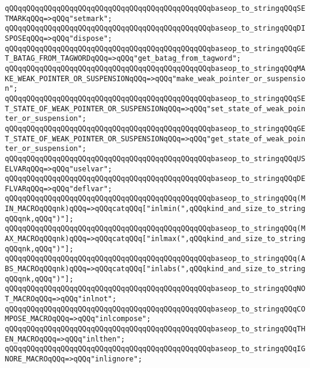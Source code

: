 \verb|qQQqqQQqqQQqqQQqqQQqqQQqqQQqqQQqqQQqqQQqqQQqqQQqbaseop_to_stringqQQqSETMARKqQQq=>qQQq"setmark";|\newline
\verb|qQQqqQQqqQQqqQQqqQQqqQQqqQQqqQQqqQQqqQQqqQQqqQQqbaseop_to_stringqQQqDISPOSEqQQq=>qQQq"dispose";|\newline
\verb|qQQqqQQqqQQqqQQqqQQqqQQqqQQqqQQqqQQqqQQqqQQqqQQqbaseop_to_stringqQQqGET_BATAG_FROM_TAGWORDqQQq=>qQQq"get_batag_from_tagword";|\newline
\verb|qQQqqQQqqQQqqQQqqQQqqQQqqQQqqQQqqQQqqQQqqQQqqQQqbaseop_to_stringqQQqMAKE_WEAK_POINTER_OR_SUSPENSIONqQQq=>qQQq"make_weak_pointer_or_suspension";|\newline
\verb|qQQqqQQqqQQqqQQqqQQqqQQqqQQqqQQqqQQqqQQqqQQqqQQqbaseop_to_stringqQQqSET_STATE_OF_WEAK_POINTER_OR_SUSPENSIONqQQq=>qQQq"set_state_of_weak_pointer_or_suspension";|\newline
\verb|qQQqqQQqqQQqqQQqqQQqqQQqqQQqqQQqqQQqqQQqqQQqqQQqbaseop_to_stringqQQqGET_STATE_OF_WEAK_POINTER_OR_SUSPENSIONqQQq=>qQQq"get_state_of_weak_pointer_or_suspension";|\newline
\verb|qQQqqQQqqQQqqQQqqQQqqQQqqQQqqQQqqQQqqQQqqQQqqQQqbaseop_to_stringqQQqUSELVARqQQq=>qQQq"uselvar";|\newline
\verb|qQQqqQQqqQQqqQQqqQQqqQQqqQQqqQQqqQQqqQQqqQQqqQQqbaseop_to_stringqQQqDEFLVARqQQq=>qQQq"deflvar";|\newline
\verb|qQQqqQQqqQQqqQQqqQQqqQQqqQQqqQQqqQQqqQQqqQQqqQQqbaseop_to_stringqQQq(MIN_MACROqQQqnk)qQQq=>qQQqcatqQQq["inlmin(",qQQqkind_and_size_to_stringqQQqnk,qQQq")"];|\newline
\verb|qQQqqQQqqQQqqQQqqQQqqQQqqQQqqQQqqQQqqQQqqQQqqQQqbaseop_to_stringqQQq(MAX_MACROqQQqnk)qQQq=>qQQqcatqQQq["inlmax(",qQQqkind_and_size_to_stringqQQqnk,qQQq")"];|\newline
\verb|qQQqqQQqqQQqqQQqqQQqqQQqqQQqqQQqqQQqqQQqqQQqqQQqbaseop_to_stringqQQq(ABS_MACROqQQqnk)qQQq=>qQQqcatqQQq["inlabs(",qQQqkind_and_size_to_stringqQQqnk,qQQq")"];|\newline
\verb|qQQqqQQqqQQqqQQqqQQqqQQqqQQqqQQqqQQqqQQqqQQqqQQqbaseop_to_stringqQQqNOT_MACROqQQq=>qQQq"inlnot";|\newline
\verb|qQQqqQQqqQQqqQQqqQQqqQQqqQQqqQQqqQQqqQQqqQQqqQQqbaseop_to_stringqQQqCOMPOSE_MACROqQQq=>qQQq"inlcompose";|\newline
\verb|qQQqqQQqqQQqqQQqqQQqqQQqqQQqqQQqqQQqqQQqqQQqqQQqbaseop_to_stringqQQqTHEN_MACROqQQq=>qQQq"inlthen";|\newline
\verb|qQQqqQQqqQQqqQQqqQQqqQQqqQQqqQQqqQQqqQQqqQQqqQQqbaseop_to_stringqQQqIGNORE_MACROqQQq=>qQQq"inlignore";|\newline

